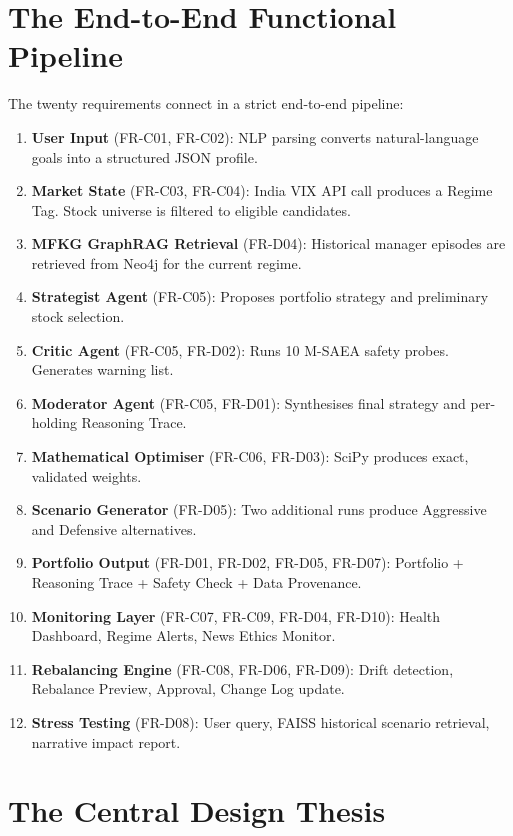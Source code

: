 \documentclass[12pt, a4paper, openany, oneside]{report}
\begin{document}
\section{The End-to-End Functional Pipeline}

The twenty requirements connect in a strict end-to-end pipeline:

\begin{enumerate}
  \item \textbf{User Input} (FR-C01, FR-C02): NLP parsing converts natural-language goals into a structured JSON profile.
  \item \textbf{Market State} (FR-C03, FR-C04): India VIX API call produces a Regime Tag. Stock universe is filtered to eligible candidates.
  \item \textbf{MFKG GraphRAG Retrieval} (FR-D04): Historical manager episodes are retrieved from Neo4j for the current regime.
  \item \textbf{Strategist Agent} (FR-C05): Proposes portfolio strategy and preliminary stock selection.
  \item \textbf{Critic Agent} (FR-C05, FR-D02): Runs 10 M-SAEA safety probes. Generates warning list.
  \item \textbf{Moderator Agent} (FR-C05, FR-D01): Synthesises final strategy and per-holding Reasoning Trace.
  \item \textbf{Mathematical Optimiser} (FR-C06, FR-D03): SciPy produces exact, validated weights.
  \item \textbf{Scenario Generator} (FR-D05): Two additional runs produce Aggressive and Defensive alternatives.
  \item \textbf{Portfolio Output} (FR-D01, FR-D02, FR-D05, FR-D07): Portfolio + Reasoning Trace + Safety Check + Data Provenance.
  \item \textbf{Monitoring Layer} (FR-C07, FR-C09, FR-D04, FR-D10): Health Dashboard, Regime Alerts, News Ethics Monitor.
  \item \textbf{Rebalancing Engine} (FR-C08, FR-D06, FR-D09): Drift detection, Rebalance Preview, Approval, Change Log update.
  \item \textbf{Stress Testing} (FR-D08): User query, FAISS historical scenario retrieval, narrative impact report.
\end{enumerate}

\section{The Central Design Thesis}
\end{document}
